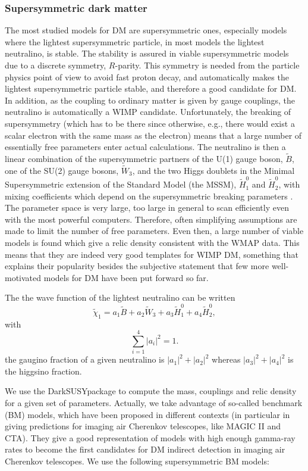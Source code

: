 \documentclass[10pt,aps,pra,reprint,amsmath,amsfonts,amssymb,showpacs,nofootinbib,floatfix]{revtex4-1}
\newcommand{\ds}{{\sc DarkSUSY}}
\begin{document}
\subsubsection{Supersymmetric dark matter}
The most studied models for DM are supersymmetric ones, especially
models where the lightest supersymmetric particle, in most models the
lightest neutralino, is stable. The stability is assured in viable
supersymmetric models due to a discrete symmetry, $R$-parity. This
symmetry is needed from the particle physics point of view to avoid
fast proton decay, and automatically makes the lightest supersymmetric
particle stable, and therefore a good candidate for DM. In addition,
as the coupling to ordinary matter is given by gauge couplings, the
neutralino is automatically a WIMP candidate. Unfortunately, the
breaking of supersymmetry (which has to be there since otherwise,
e.g., there would exist a scalar electron with the same mass as the
electron) means that a large number of essentially free parameters
enter actual calculations.  The neutralino is then a linear
combination of the supersymmetric partners of the U(1) gauge boson,
$\tilde B$, one of the SU(2) gauge bosons, $\tilde W_3$, and the two
Higgs doublets in the Minimal Supersymmetric extension of the Standard
Model (the MSSM), $\tilde H_1^0$ and $\tilde H_2^0$, with mixing
coefficients which depend on the supersymmetric breaking parameters
\cite{1984NuPhB.238..453E}. The parameter space is very large, too
large in general to scan efficiently even with the most powerful
computers. Therefore, often simplifying assumptions are made to limit
the number of free parameters. Even then, a large number of viable
models is found which give a relic density consistent with the WMAP
data. This means that they are indeed very good templates for WIMP DM,
something that explains their popularity besides the subjective
statement that few more well-motivated models for DM have been put forward
so far.

The the wave function of the lightest neutralino can be written
\begin{equation}
\tilde\chi_1=a_1\tilde B+a_2\tilde W_3+a_3 \tilde H_1^0+a_4\tilde H_2^0,
\end{equation}
with 
\begin{equation}
\sum_{i=1}^4 |a_i|^2=1.
\end{equation}
the gaugino fraction of a given neutralino is $|a_1|^2+|a_2|^2$
whereas $|a_3|^2+|a_4|^2$ is the higgsino fraction.

We use the \ds package \cite{ds} to compute the mass, couplings and
relic density for a given set of parameters.  Actually, we take
advantage of so-called benchmark (BM) models, which have been proposed
in different contexts (in particular in \cite{Bringmann:2008kj} giving
predictions for imaging air Cherenkov telescopes, like MAGIC II and
CTA). They give a good representation of models with high enough
gamma-ray rates to become the first candidates for DM indirect
detection in imaging air Cherenkov telescopes. We use the following
supersymmetric BM models:
\end{document}
